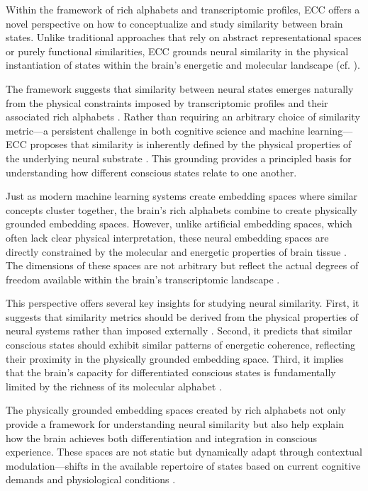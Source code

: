 \begin{refsection}
Within the framework of rich alphabets and transcriptomic profiles, ECC offers a novel perspective on how to conceptualize and study similarity between brain states. Unlike traditional approaches that rely on abstract representational spaces or purely functional similarities, ECC grounds neural similarity in the physical instantiation of states within the brain's energetic and molecular landscape (cf. \cite{bobadilla-suarez2020measures}).

The framework suggests that similarity between neural states emerges naturally from the physical constraints imposed by transcriptomic profiles and their associated rich alphabets \cite{thompson2014human}. Rather than requiring an arbitrary choice of similarity metric—a persistent challenge in both cognitive science and machine learning—ECC proposes that similarity is inherently defined by the physical properties of the underlying neural substrate \cite{trapnell2015defining}. This grounding provides a principled basis for understanding how different conscious states relate to one another.

Just as modern machine learning systems create embedding spaces where similar concepts cluster together, the brain's rich alphabets combine to create physically grounded embedding spaces. However, unlike artificial embedding spaces, which often lack clear physical interpretation, these neural embedding spaces are directly constrained by the molecular and energetic properties of brain tissue \cite{wang2018three}. The dimensions of these spaces are not arbitrary but reflect the actual degrees of freedom available within the brain's transcriptomic landscape \cite{tasic2018shared}.

This perspective offers several key insights for studying neural similarity. First, it suggests that similarity metrics should be derived from the physical properties of neural systems rather than imposed externally \cite{bakken2021comparative}. Second, it predicts that similar conscious states should exhibit similar patterns of energetic coherence, reflecting their proximity in the physically grounded embedding space. Third, it implies that the brain's capacity for differentiated conscious states is fundamentally limited by the richness of its molecular alphabet \cite{cembrowski2018continuous}.

The physically grounded embedding spaces created by rich alphabets not only provide a framework for understanding neural similarity but also help explain how the brain achieves both differentiation and integration in conscious experience. These spaces are not static but dynamically adapt through contextual modulation—shifts in the available repertoire of states based on current cognitive demands and physiological conditions \cite{lein2017promise}.


\end{refsection}
